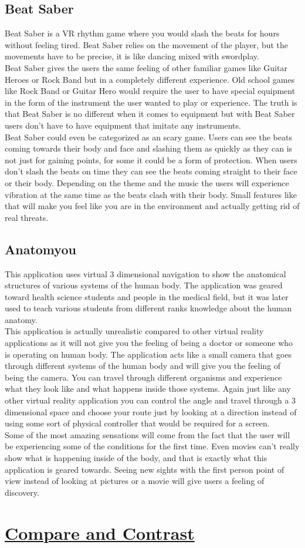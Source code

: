 \documentclass{article}
\begin{document}
\subsection*{Beat Saber}
Beat Saber is a VR rhythm game where you would slash the beats for hours without feeling tired. Beat Saber relies on the movement of the player, but the movements have to be precise, it is like dancing mixed with swordplay. \\
Beat Saber gives the users the same feeling of other familiar games like Guitar Heroes or Rock Band but in a completely different experience. Old school games like Rock Band or Guitar Hero would require the user to have special equipment in the form of the instrument the user wanted to play or experience. The truth is that Beat Saber is no different when it comes to equipment but with Beat Saber users don't have to have equipment that imitate any instruments. \\
Beat Saber could even be categorized as an scary game. Users can see the beats coming towards their body and face and slashing them as quickly as they can is not just for gaining points, for some it could be a form of protection. When users don't slash the beats on time they can see the beats coming straight to their face or their body. Depending on the theme and the music the users will  experience vibration at the same time as the beats clash with their body. Small features like that will make you feel like you are in the environment and actually getting rid of real threats. 



\subsection*{Anatomyou}
This application uses virtual 3 dimensional navigation to show the anatomical structures of various systems of the human body. The application was geared toward health science students and people in the medical field, but it was later used to teach various students from different ranks knowledge about the human anatomy.\\
This application is actually unrealistic compared to other virtual reality applications as it will not give you the feeling of being a doctor or someone who is operating on human body. The application acts like a small camera that goes through different systems of the human body and will give you the feeling of being the camera. You can travel through different organisms and experience what they look like and what happens inside those systems. Again just like any other virtual reality application you can control the angle and travel through a 3 dimensional space and choose your route just by looking at a direction instead of using some sort of physical controller that would be required for a screen. \\
Some of the most amazing sensations will come from the fact that the user will be experiencing some of the conditions for the first time. Even movies can't really show what is happening inside of the body, and that is exactly what this application is geared towards. Seeing new sights with the first person point of view instead of looking at pictures or a movie will give users a feeling of discovery.

\newpage

\section*{\underline{Compare and Contrast}}
\end{document}
